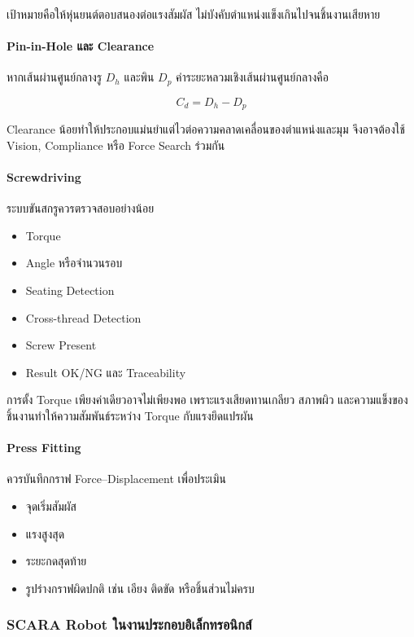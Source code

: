 เป้าหมายคือให้หุ่นยนต์ตอบสนองต่อแรงสัมผัส ไม่บังคับตำแหน่งแข็งเกินไปจนชิ้นงานเสียหาย

\paragraph{Pin-in-Hole และ Clearance}

หากเส้นผ่านศูนย์กลางรู $D_h$ และพิน $D_p$ ค่าระยะหลวมเชิงเส้นผ่านศูนย์กลางคือ

\[
C_d=D_h-D_p
\]

Clearance น้อยทำให้ประกอบแม่นยำแต่ไวต่อความคลาดเคลื่อนของตำแหน่งและมุม จึงอาจต้องใช้ Vision, Compliance หรือ Force Search ร่วมกัน

\paragraph{Screwdriving}

ระบบขันสกรูควรตรวจสอบอย่างน้อย

\begin{itemize}
    \item Torque
    \item Angle หรือจำนวนรอบ
    \item Seating Detection
    \item Cross-thread Detection
    \item Screw Present
    \item Result OK/NG และ Traceability
\end{itemize}

การตั้ง Torque เพียงค่าเดียวอาจไม่เพียงพอ เพราะแรงเสียดทานเกลียว สภาพผิว และความแข็งของชิ้นงานทำให้ความสัมพันธ์ระหว่าง Torque กับแรงยึดแปรผัน

\paragraph{Press Fitting}

ควรบันทึกกราฟ Force–Displacement เพื่อประเมิน

\begin{itemize}
    \item จุดเริ่มสัมผัส
    \item แรงสูงสุด
    \item ระยะกดสุดท้าย
    \item รูปร่างกราฟผิดปกติ เช่น เอียง ติดขัด หรือชิ้นส่วนไม่ครบ
\end{itemize}

\subsubsection{SCARA Robot ในงานประกอบอิเล็กทรอนิกส์}

